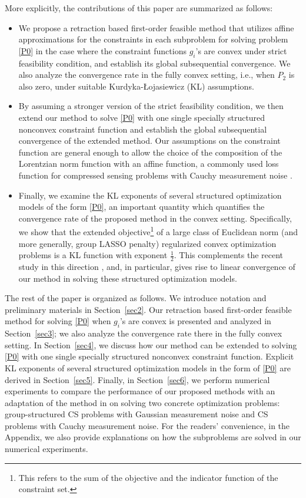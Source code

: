 \documentclass[10pt]{article}
\numberwithin{equation}{section}
\begin{document}
More explicitly, the contributions of this paper are summarized as follows:
\begin{itemize}
  \item We propose a retraction based first-order feasible method that utilizes affine approximations for the constraints in each subproblem for solving problem \eqref{P0} in the case where the constraint functions $g_i$'s are convex under strict feasibility condition, and establish its global subsequential convergence. We also analyze the convergence rate in the fully convex setting, i.e., when $P_2$ is also zero, under suitable Kurdyka-{\L}ojasiewicz (KL) assumptions.
  \item By assuming {\color{black} a stronger version of the strict feasibility condition}, we then extend our method to solve \eqref{P0} with one single specially structured nonconvex constraint function and establish the global subsequential convergence of the extended method. Our assumptions on the constraint function are general enough to allow the choice of the composition of the Lorentzian norm function with an affine function, a commonly used loss function for compressed sensing problems with Cauchy measurement noise \cite{CaBA10}.
  \item Finally, we examine the KL exponents of several structured optimization models of the form \eqref{P0}, an important quantity which quantifies the convergence rate of the proposed method in the convex setting. Specifically, we show that the extended objective\footnote{This refers to the sum of the objective and the indicator function of the constraint set.} of a large class of Euclidean norm (and more generally, group LASSO penalty) regularized convex optimization problems is a KL function with exponent $\frac12$. This complements the recent study in this direction \cite{LiPong18,YuLiPo19,YuLP20,ZYuP20}, and, in particular, gives rise to linear convergence of our method in solving these structured optimization models.
\end{itemize}

The rest of the paper is organized as follows. We introduce notation and preliminary materials in Section~\ref{sec2}. Our retraction based first-order feasible method for solving \eqref{P0} when $g_i$'s are convex is presented and analyzed in Section~\ref{sec3}; we also analyze the convergence rate there in the fully convex setting. In Section~\ref{sec4}, we discuss how our method can be extended to solving \eqref{P0} with one single specially structured nonconvex constraint function. Explicit KL exponents of several structured optimization models in the form of \eqref{P0} are derived in Section~\ref{sec5}. Finally, in Section~\ref{sec6}, we perform numerical experiments to compare the performance of our proposed methods with an adaptation of the method in \cite{Au13} on solving two concrete optimization problems: group-structured CS problems with Gaussian measurement noise and CS problems with Cauchy measurement noise. For the readers' convenience, in the Appendix, we also provide explanations on how the subproblems are solved in our numerical experiments.
\end{document}
